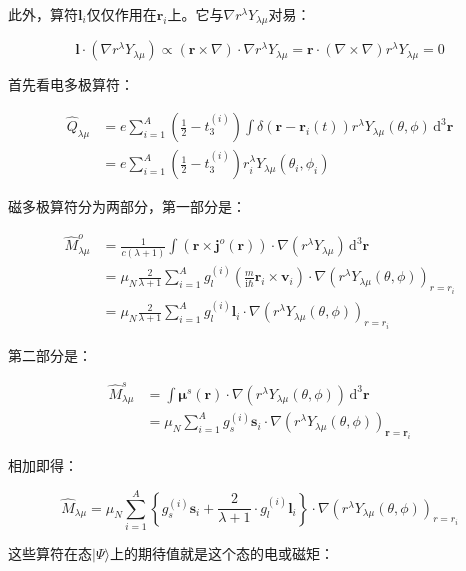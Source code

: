 此外，算符$\boldsymbol{l}_{i}$仅仅作用在$\boldsymbol{r}_{i}$上。它与$\nabla r^{\lambda}Y_{\lambda\mu}$对易：

\begin{equation}
\boldsymbol{l}\cdot(\nabla r^{\lambda}Y_{\lambda\mu})\propto(\boldsymbol{r}\times\nabla)\cdot\nabla r^{\lambda}Y_{\lambda\mu}=\boldsymbol{r}\cdot(\nabla\times\nabla)r^{\lambda}Y_{\lambda\mu}=0
\end{equation}

\begin{booknote*}
首先看电多极算符：

\begin{align*}
\hat{Q}_{\lambda\mu} & =e\sum^{A}_{i=1}\left(\frac{1}{2}-t^{(i)}_{3}\right)\int\delta(\boldsymbol{r}-\boldsymbol{r}_{i}(t))r^{\lambda}Y_{\lambda\mu}(\theta,\phi)\,\mathrm{d}^{3}\boldsymbol{r}\\
 & =e\sum^{A}_{i=1}\left(\frac{1}{2}-t^{(i)}_{3}\right)r^{\lambda}_{i}Y_{\lambda\mu}(\theta_{i},\phi_{i})
\end{align*}

磁多极算符分为两部分，第一部分是：

\begin{align*}
\hat{M}^{o}_{\lambda\mu} & =\frac{1}{c(\lambda+1)}\int(\boldsymbol{r}\times\boldsymbol{j}^{o}(\boldsymbol{r}))\cdot\nabla(r^{\lambda}Y_{\lambda\mu})\,\mathrm{d}^{3}\boldsymbol{r}\\
 & =\mu_{N}\frac{2}{\lambda+1}\sum^{A}_{i=1}g^{(i)}_{l}(\frac{m}{\mathrm{i}\hbar}\boldsymbol{r}_{i}\times\boldsymbol{v}_{i})\cdot\nabla(r^{\lambda}Y_{\lambda\mu}(\theta,\phi))_{r=r_{i}}\\
 & =\mu_{N}\frac{2}{\lambda+1}\sum^{A}_{i=1}g^{(i)}_{l}\boldsymbol{l}_{i}\cdot\nabla(r^{\lambda}Y_{\lambda\mu}(\theta,\phi))_{r=r_{i}}
\end{align*}

第二部分是：

\begin{align*}
\hat{M}^{s}_{\lambda\mu} & =\int\boldsymbol{\mu}^{s}(\boldsymbol{r})\cdot\nabla(r^{\lambda}Y_{\lambda\mu}(\theta,\phi))\,\mathrm{d}^{3}\boldsymbol{r}\\
 & =\mu_{N}\sum^{A}_{i=1}g^{(i)}_{s}\boldsymbol{s}_{i}\cdot\nabla(r^{\lambda}Y_{\lambda\mu}(\theta,\phi))_{\boldsymbol{r}=\boldsymbol{r}_{i}}
\end{align*}

相加即得：

\[
\hat{M}_{\lambda\mu}=\mu_{N}\sum^{A}_{i=1}\left\{ g^{(i)}_{s}\boldsymbol{s}_{i}+\frac{2}{\lambda+1}\cdot g^{(i)}_{l}\boldsymbol{l}_{i}\right\} \cdot\nabla(r^{\lambda}Y_{\lambda\mu}(\theta,\phi))_{r=r_{i}}
\]
\end{booknote*}
这些算符在态$|\Psi\rangle$上的期待值就是这个态的电或磁矩：

